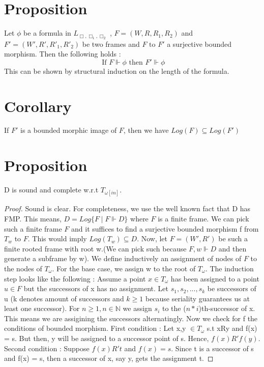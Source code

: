 \documentclass[12pt, a4paper]{scrreprt}
\begin{document}
\section {Proposition}
Let $\phi$ be a formula in $L_{\Box, \Box_1, \Box_2}$ , $F = (W, R, R_1, R_2)$ and $F' = (W', R', R'_1, R'_2)$ be two frames and $F \mbox{ to } F'$ a surjective bounded morphism. Then the following holds :
$$ \mbox{ If }F \Vdash \phi \mbox{ then } F' \Vdash \phi$$
This can be shown by structural induction on the length of the formula.

\section{Corollary}
If $F'$ is a bounded morphic image of $F$, then we have $Log(F) \subseteq Log(F')$

\section{Proposition}
D is sound and complete w.r.t $T_{\omega[in]}$.

\begin{proof}
Sound is clear. For completeness, we use the well known fact that D has FMP. This means, $D = Log\{F \mid F \Vdash D\}$ where $F$ is a finite frame.
We can pick such a finite frame $F$ and it suffices to find a surjective bounded morphism f from $T_w$ to $F$. This would imply $Log(T_w) \subseteq D$. \newline
Now, let $F = (W', R')$ be such a finite rooted frame with root w.(We can pick such because $F,w \Vdash D$ and then generate a subframe by w). We define 
inductively an assignment of nodes of $F$ to the nodes of $T_\omega$. For the base case, we assign w to the root of $T_\omega$. The induction step looks like the following : 
Assume a point $x \in T_\omega$ has been assigned to a point $u \in F$ but the successors of x has no assignment. 
Let $s_1, s_2, ..., s_k$ be successors of u (k denotes amount of successors and $k\geq 1$ because seriality guarantees us at least one successor).
For $n \geq 1, n \in \mathbb{N}$ we assign $s_i$ to the ($n * i$)th-successor of x. This means we are assigining the successors alternatingly. \newline
Now we check for f the conditions of bounded morphism. First condition : Let x,y $\in T_\omega$ s.t xRy and f(x) = s. But then, y will be assigned to a successor point of s. 
Hence, $f(x) R'f(y)$. Second condition : Suppose $f(x)R't$ and $f(x) = s$. Since t is a successor of s and f(x) = s, then a successor of x, say y, gets the assignment t. 

\end{proof}
\end{document}
